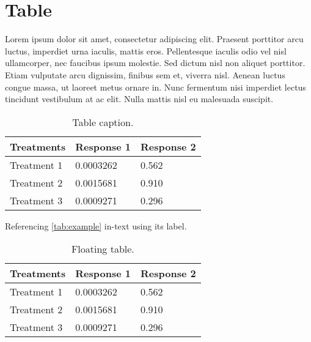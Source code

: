 \documentclass[
	11pt, %
	fleqn, %
	letterpaper, %
]{CommodoreBlueBook}
\begin{document}
\section{Table}

Lorem ipsum dolor sit amet, consectetur adipiscing elit. Praesent porttitor
arcu luctus, imperdiet urna iaculis, mattis eros. Pellentesque iaculis odio vel
nisl ullamcorper, nec faucibus ipsum molestie. Sed dictum nisl non aliquet
porttitor. Etiam vulputate arcu dignissim, finibus sem et, viverra nisl. Aenean
luctus congue massa, ut laoreet metus ornare in. Nunc fermentum nisi imperdiet
lectus tincidunt vestibulum at ac elit. Nulla mattis nisl eu malesuada
suscipit.

\begin{table}[H] %
	\centering %
	\begin{tabular}{L{0.15\textwidth} R{0.15\textwidth} R{0.15\textwidth}} %
		\toprule
		\textbf{Treatments} & \textbf{Response 1} & \textbf{Response 2}\\
		\midrule
		Treatment 1 & 0.0003262 & 0.562 \\
		Treatment 2 & 0.0015681 & 0.910 \\
		Treatment 3 & 0.0009271 & 0.296 \\
		\bottomrule
	\end{tabular}
	\caption{Table caption.}
	\label{tab:example} %
\end{table}

Referencing \autoref{tab:example} in-text using its label.

\begin{table}[t] %
	\centering %
	\begin{tabular}{L{0.15\textwidth} R{0.15\textwidth} R{0.15\textwidth}} %
		\toprule
		\textbf{Treatments} & \textbf{Response 1} & \textbf{Response 2}\\
		\midrule
		Treatment 1 & 0.0003262 & 0.562 \\
		Treatment 2 & 0.0015681 & 0.910 \\
		Treatment 3 & 0.0009271 & 0.296 \\
		\bottomrule
	\end{tabular}
	\caption{Floating table.}
	\label{tab:floating} %
\end{table}
\end{document}
